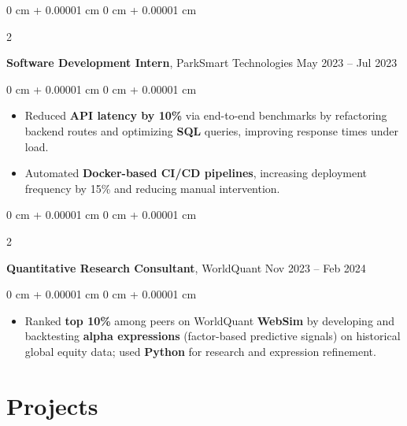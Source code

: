 \documentclass[10pt, letterpaper]{article}
\newenvironment{highlightsjustified}{
    \begin{itemize}[
        topsep=0.10 cm,
        parsep=0.10 cm,
        partopsep=0pt,
        itemsep=0pt,
        leftmargin=0 cm + 10pt
    ]
    \justifying
}{
    \end{itemize}
} %
\newenvironment{onecolentry}{
    \begin{adjustwidth}{
        0 cm + 0.00001 cm
    }{
        0 cm + 0.00001 cm
    }
}{
    \end{adjustwidth}
} %
\newenvironment{twocolentry}[2][]{
    \onecolentry
    \def\secondColumn{#2}
    \setcolumnwidth{\fill, 4.5 cm}
    \begin{paracol}{2}
}{
    \switchcolumn \raggedleft \secondColumn
    \end{paracol}
    \endonecolentry
} %
\begin{document}
        \vspace{0.2 cm}

        \begin{twocolentry}{
            May 2023 – Jul 2023
        }
            \textbf{Software Development Intern}, ParkSmart Technologies\end{twocolentry}

        \vspace{0.10 cm}
        \begin{onecolentry}
            \begin{highlightsjustified}
                \item Reduced \textbf{API latency by 10\%} via end-to-end benchmarks by refactoring backend routes and optimizing \textbf{SQL} queries, improving response times under load.
                \item Automated \textbf{Docker-based CI/CD pipelines}, increasing deployment frequency by 15\% and reducing manual intervention.
            \end{highlightsjustified}
        \end{onecolentry}

        \vspace{0.2 cm}

        \begin{twocolentry}{
            Nov 2023 – Feb 2024
        }
            \textbf{Quantitative Research Consultant}, WorldQuant\end{twocolentry}

        \vspace{0.10 cm}
        \begin{onecolentry}
            \begin{highlightsjustified}
                \item Ranked \textbf{top 10\%} among peers on WorldQuant \textbf{WebSim} by developing and backtesting \textbf{alpha expressions} (factor-based predictive signals) on historical global equity data; used \textbf{Python} for research and expression refinement.
            \end{highlightsjustified}
        \end{onecolentry}


    
    \section{Projects}
\end{document}
